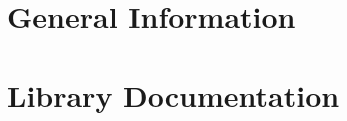 \documentclass[letterpaper,10pt,titlepage]{custbook}
\begin{document}
%

%

%
\frontmatter{}
%

%

%
\tableofcontents
%
\listoftables
%
\listoffigures
%
%
\mainmatter{}
%
\part{General Information}



\part{Library Documentation}

%

%

%

%

%

%

%

%

%

%

%

%

%

%

%
\end{document}
